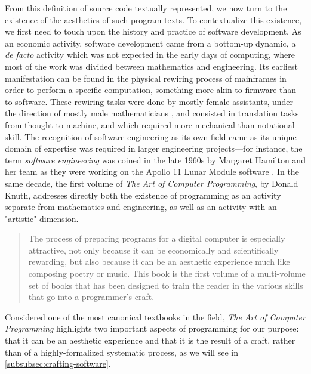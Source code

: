 From this definition of source code textually represented, we now turn to the existence of the aesthetics of such program texts. To contextualize this existence, we first need to touch upon the history and practice of software development. As an economic activity, software development came from a bottom-up dynamic, a \emph{de facto} activity which was not expected in the early days of computing, where most of the work was divided between mathematics and engineering. Its earliest manifestation can be found in the physical rewiring process of mainframes in order to perform a specific computation, something more akin to firmware than to software. These rewiring tasks were done by mostly female assistants, under the direction of mostly male mathematicians \citep{chun_software_2005}, and consisted in translation tasks from thought to machine, and which required more mechanical than notational skill. The recognition of software engineering as its own field came as its unique domain of expertise was required in larger engineering projects—for instance, the term \emph{software engineering} was coined in the late 1960s by Margaret Hamilton and her team as they were working on the Apollo 11 Lunar Module software \citep{mindell_digital_2011}. In the same decade, the first volume of \emph{The Art of Computer Programming}, by Donald Knuth, addresses directly both the existence of programming as an activity separate from mathematics and engineering, as well as an activity with an "artistic" dimension.

\begin{quote}
    The process of preparing programs for a digital computer is especially attractive, not only because it can be economically and scientifically rewarding, but also because it can be an aesthetic experience much like composing poetry or music. This book is the first volume of a multi-volume set of books that has been designed to train the reader in the various skills that go into a programmer's craft. \citep{knuth_art_1997}
\end{quote}

Considered one of the most canonical textbooks in the field, \emph{The Art of Computer Programming} highlights two important aspects of programming for our purpose: that it can be an aesthetic experience and that it is the result of a craft, rather than of a highly-formalized systematic process, as we will see in \ref{subsubsec:crafting-software}.


